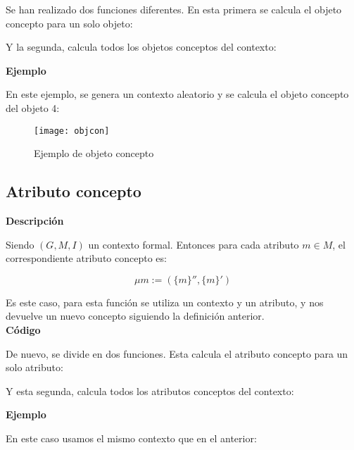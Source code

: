         Se han realizado dos funciones diferentes. En esta primera se calcula el objeto concepto para un solo objeto:
        
        

        Y la segunda, calcula todos los objetos conceptos del contexto:
        

        \bigskip

        \textbf{Ejemplo}

        En este ejemplo, se genera un contexto aleatorio y se calcula el objeto concepto del objeto 4:

        \begin{figure}[H]
            \centering
            \texttt{[image: objcon]}
            \caption{Ejemplo de objeto concepto}
            \label{fig:objcon}
        \end{figure}




    \subsection{Atributo concepto}

    
        \textbf{Descripci\'on}

        Siendo \( (G, M, I) \) un contexto formal. Entonces para cada atributo \( m \in M\), el correspondiente atributo concepto es:

        \[ \mu m:=(\{m\}'', \{m\}') \]

        Es este caso, para esta funci\'on se utiliza un contexto y un atributo, y nos devuelve un nuevo concepto siguiendo la definici\'on 
        anterior.
        \\


        \textbf{C\'odigo}

        De nuevo, se divide en dos funciones. Esta calcula el atributo concepto para un solo atributo:

        

        Y esta segunda, calcula todos los atributos conceptos del contexto:
        

        \clearpage

        \textbf{Ejemplo}

        En este caso usamos el mismo contexto que en el anterior:

